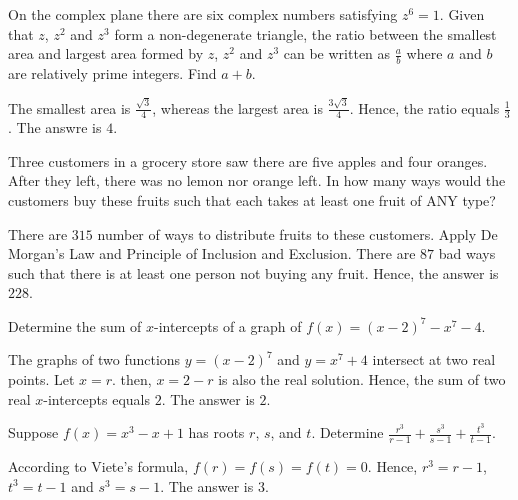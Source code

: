 \begin{problem}
On the complex plane there are six complex numbers satisfying $z^6=1$. Given that $z$, $z^2$ and $z^3$ form a non-degenerate triangle, the ratio between the smallest area and largest area formed by $z$, $z^2$ and $z^3$ can be written as $\frac{a}{b}$ where $a$ and $b$ are relatively prime integers. Find $a+b$.
\end{problem}

\begin{solution}
The smallest area is $\frac{\sqrt{3}}{4}$, whereas the largest area is $\frac{3\sqrt{3}}{4}$. Hence, the ratio equals $\frac{1}{3}$. The answre is $4$.
\end{solution}

\begin{problem}
Three customers in a grocery store saw there are five apples and four oranges. After they left, there was no lemon nor orange left. In how many ways would the customers buy these fruits such that each takes at least one fruit of ANY type?
\end{problem}

\begin{solution}
There are $315$ number of ways to distribute fruits to these customers. Apply De Morgan's Law and Principle of Inclusion and Exclusion. There are $87$ bad ways such that there is at least one person not buying any fruit. Hence, the answer is $228$.
\end{solution}

\begin{problem}
Determine the sum of $x$-intercepts of a graph of $f(x)=(x-2)^7-x^7-4$.
\end{problem}

\begin{solution}
The graphs of two functions $y=(x-2)^7$ and $y=x^7+4$ intersect at two real points. Let $x=r$. then, $x=2-r$ is also the real solution. Hence, the sum of two real $x$-intercepts equals $2$. The answer is $2$.
\end{solution}

\begin{problem}
Suppose $f(x)=x^3-x+1$ has roots $r$, $s$, and $t$. Determine $\frac{r^3}{r-1}+\frac{s^3}{s-1}+\frac{t^3}{t-1}$.
\end{problem}

\begin{solution}
According to Viete's formula, $f(r)=f(s)=f(t)=0$. Hence, $r^3=r-1$, $t^3=t-1$ and $s^3=s-1$. The answer is $3$. 
\end{solution}

